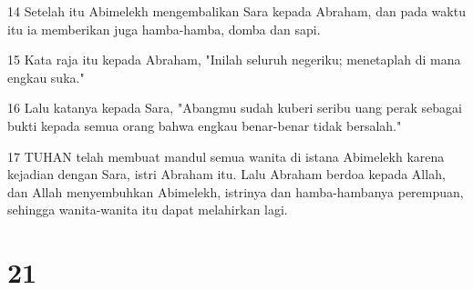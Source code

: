 \par 14 Setelah itu Abimelekh mengembalikan Sara kepada Abraham, dan pada waktu itu ia memberikan juga hamba-hamba, domba dan sapi.
\par 15 Kata raja itu kepada Abraham, "Inilah seluruh negeriku; menetaplah di mana engkau suka."
\par 16 Lalu katanya kepada Sara, "Abangmu sudah kuberi seribu uang perak sebagai bukti kepada semua orang bahwa engkau benar-benar tidak bersalah."
\par 17 TUHAN telah membuat mandul semua wanita di istana Abimelekh karena kejadian dengan Sara, istri Abraham itu. Lalu Abraham berdoa kepada Allah, dan Allah menyembuhkan Abimelekh, istrinya dan hamba-hambanya perempuan, sehingga wanita-wanita itu dapat melahirkan lagi.

\chapter{21}

